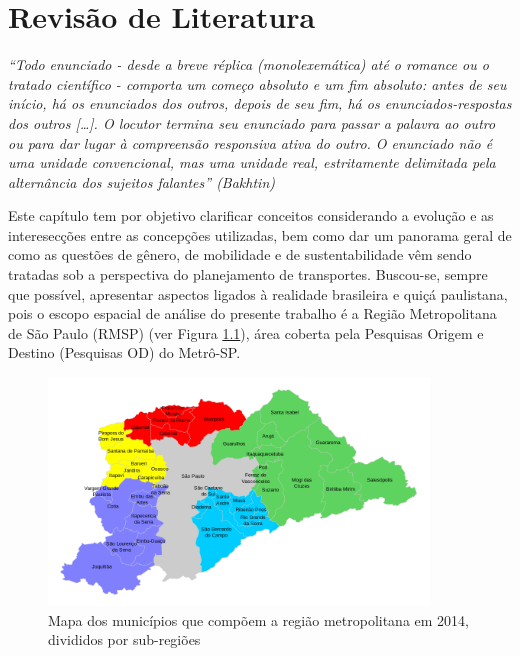 \chapter{Revisão de Literatura}\label{chap:revisao-literatura}
\begin{citacao}
	\begin{flushright}  
\emph{``Todo enunciado - desde a breve réplica (monolexemática) até o romance ou o tratado científico - comporta um começo absoluto e um fim absoluto: antes de seu início, há os enunciados dos outros, depois de seu fim, há os enunciados-respostas dos outros [\ldots]. O locutor termina seu enunciado para passar a palavra ao outro ou para dar lugar à compreensão responsiva ativa do outro. O enunciado não é uma unidade convencional, mas uma unidade real, estritamente delimitada pela alternância dos sujeitos falantes'' (Bakhtin)}
	\end{flushright}
\end{citacao}

Este capítulo tem por objetivo clarificar conceitos considerando a evolução e as interesecções entre as concepções utilizadas, bem como dar um panorama geral de como as questões de gênero, de mobilidade e de sustentabilidade vêm sendo tratadas sob a perspectiva do planejamento de transportes. 
Buscou-se, sempre que possível, apresentar aspectos ligados à realidade brasileira e quiçá paulistana, pois o escopo espacial de análise do presente trabalho é a Região Metropolitana de São Paulo (RMSP) (ver Figura \ref{fig:mapa-rmsp}), área coberta pela Pesquisas Origem e Destino (Pesquisas OD) do Metrô-SP. 

\begin{figure}[htb]%
    \caption{\label{fig:mapa-rmsp}Mapa dos municípios que compõem a região metropolitana em 2014, divididos por sub-regiões \cite{LEI1139}}%
    \begin{center}%
        \includegraphics[width=0.9\textwidth]{./imagens/Mapa-RMSP-subregions.png}%
    \end{center}%
\end{figure}%

